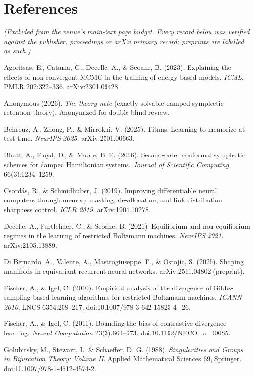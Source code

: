\documentclass[10pt]{article}
\begin{document}
\section*{References}
{\small\emph{(Excluded from the venue's main-text page budget. Every record below was verified against the publisher, proceedings or arXiv primary record; preprints are labelled as such.)}\par\medskip
\begingroup
\setlength{\parindent}{-0.22in}\setlength{\leftskip}{0.22in}\setlength{\parskip}{2pt}

Agoritsas, E., Catania, G., Decelle, A., \& Seoane, B. (2023). Explaining the effects of non-convergent MCMC in the training of energy-based models. \emph{ICML}, PMLR 202:322--336. arXiv:2301.09428.\par
Anonymous (2026). \emph{The theory note} (exactly-solvable damped-symplectic retention theory). Anonymized for double-blind review.\par
Behrouz, A., Zhong, P., \& Mirrokni, V. (2025). Titans: Learning to memorize at test time. \emph{NeurIPS 2025}. arXiv:2501.00663.\par
Bhatt, A., Floyd, D., \& Moore, B. E. (2016). Second-order conformal symplectic schemes for damped Hamiltonian systems. \emph{Journal of Scientific Computing} 66(3):1234--1259.\par
Csord\'as, R., \& Schmidhuber, J. (2019). Improving differentiable neural computers through memory masking, de-allocation, and link distribution sharpness control. \emph{ICLR 2019}. arXiv:1904.10278.\par
Decelle, A., Furtlehner, C., \& Seoane, B. (2021). Equilibrium and non-equilibrium regimes in the learning of restricted Boltzmann machines. \emph{NeurIPS 2021}. arXiv:2105.13889.\par
Di Bernardo, A., Valente, A., Mastrogiuseppe, F., \& Ostojic, S. (2025). Shaping manifolds in equivariant recurrent neural networks. arXiv:2511.04802 (preprint).\par
Fischer, A., \& Igel, C. (2010). Empirical analysis of the divergence of Gibbs-sampling-based learning algorithms for restricted Boltzmann machines. \emph{ICANN 2010}, LNCS 6354:208--217. doi:10.1007/978-3-642-15825-4\_26.\par
Fischer, A., \& Igel, C. (2011). Bounding the bias of contrastive divergence learning. \emph{Neural Computation} 23(3):664--673. doi:10.1162/NECO\_a\_00085.\par
Golubitsky, M., Stewart, I., \& Schaeffer, D. G. (1988). \emph{Singularities and Groups in Bifurcation Theory: Volume II}. Applied Mathematical Sciences 69, Springer. doi:10.1007/978-1-4612-4574-2.\par
}
\end{document}
